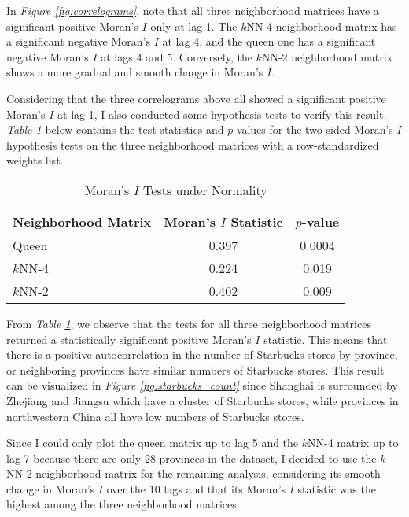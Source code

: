 \documentclass{article}
\begin{document}
In \textit{Figure \ref{fig:correlograms}}, note that all three neighborhood matrices have a significant positive Moran's \(I\) only at lag 1. The \(k\)NN-4 neighborhood matrix has a significant negative Moran's \(I\) at lag 4, and the queen one has a significant negative Moran's \(I\) at lags 4 and 5. Conversely, the \(k\)NN-2 neighborhood matrix shows a more gradual and smooth change in Moran's \(I\).

Considering that the three correlograms above all showed a significant positive Moran's \(I\) at lag 1, I also conducted some hypothesis tests to verify this result. \textit{Table \ref{tab:moran_i_tests}} below contains the test statistics and \(p\)-values for the two-sided Moran's \(I\) hypothesis tests on the three neighborhood matrices with a row-standardized weights list.

\begin{table}[htbp]
    \centering
    \begin{tabular}{l c c}
        \toprule
        \textbf{Neighborhood Matrix} & \textbf{Moran's \(I\) Statistic} & \textbf{\(p\)-value} \\
        \midrule
        Queen & 0.397 & 0.0004 \\
        \(k\)NN-4 & 0.224 & 0.019 \\
        \(k\)NN-2 & 0.402 & 0.009 \\
        \bottomrule
    \end{tabular}
    \caption{Moran's \(I\) Tests under Normality}
    \label{tab:moran_i_tests}
\end{table}

From \textit{Table \ref{tab:moran_i_tests}}, we observe that the tests for all three neighborhood matrices returned a statistically significant positive Moran's \(I\) statistic. This means that there is a positive autocorrelation in the number of Starbucks stores by province, or neighboring provinces have similar numbers of Starbucks stores. This result can be visualized in \textit{Figure \ref{fig:starbucks_count}} since Shanghai is surrounded by Zhejiang and Jiangsu which have a cluster of Starbucks stores, while provinces in northwestern China all have low numbers of Starbucks stores.

Since I could only plot the queen matrix up to lag 5 and the \(k\)NN-4 matrix up to lag 7 because there are only 28 provinces in the dataset, I decided to use the \(k\)NN-2 neighborhood matrix for the remaining analysis, considering its smooth change in Moran's \(I\) over the 10 lags and that its Moran's \(I\) statistic was the highest among the three neighborhood matrices.
\end{document}
